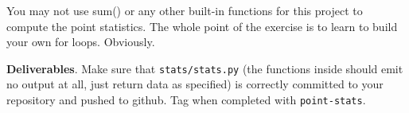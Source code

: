\begin{fullwidth}
\begin{callout}{\bctakecare}
You may not use sum() or any other built-in functions for this project to compute the point statistics.  The whole point of the exercise is to learn to build your own for loops. Obviously.
\end{callout}

\begin{callout}{\bcplume}
{\bf Deliverables}. Make sure that {\tt stats/stats.py} (the functions inside should emit no output at all, just return data as specified) is correctly committed to your repository and pushed to github. Tag when completed with {\tt point-stats}.
\end{callout}


\end{fullwidth}


